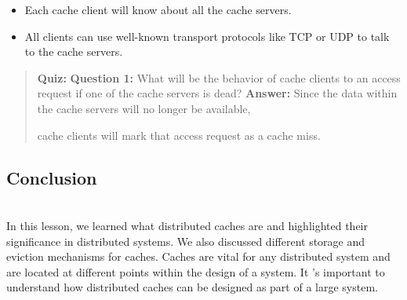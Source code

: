 \begin{itemize}
\item
\protect{}\label{GrRhqb6U_9ZQHn-dp8eXK}
Each cache client will know about all the cache servers.
\item
\protect{}\label{zbwccHo7P3LmexPzULrE5}
All clients can use well-known transport protocols like TCP or UDP to talk to the cache servers.
\end{itemize}

\begin{quote}
\textbf{Quiz:}
\textbf{Question 1:} What will be the behavior of cache clients to an access request if one of the cache servers is dead?
\textbf{Answer:} Since the data within the cache servers will no longer be available,

cache clients will mark that access request as a cache miss.
\end{quote}

\subsection{Conclusion}\label{cf8yOrpRwjVzhXXmQ2TuN}
\\
In this lesson, we learned what distributed caches are and highlighted their significance in distributed systems. We also discussed different storage and eviction mechanisms for caches. Caches are vital for any distributed system and are located at different points within the design of a system. It 's important to understand how distributed caches can be designed as part of a large system.

